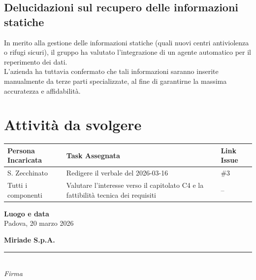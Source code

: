 \documentclass[a4paper, 10pt, colorlinks=true, linkcolor=black, urlcolor=blue, citecolor=blue, hidelinks]{article}
\begin{document}
\subsection{Delucidazioni sul recupero delle informazioni statiche}
In merito alla gestione delle informazioni statiche (quali nuovi centri antiviolenza o rifugi sicuri), il gruppo ha valutato l’integrazione di un agente automatico per il reperimento dei dati. \\ L’azienda ha tuttavia confermato che tali informazioni saranno inserite manualmente da terze parti
specializzate, al fine di garantirne la massima accuratezza e affidabilità.

\section{Attività da svolgere}
\begin{center}
\renewcommand{\arraystretch}{1.4}
\begin{tabular}{|p{4.2cm}|p{6.2cm}|p{2.2cm}|}
\hline
\textbf{Persona Incaricata} & \textbf{Task Assegnata} & \centering\textbf{Link Issue} \tabularnewline
\hline
S. Zecchinato & Redigere il verbale del 2026-03-16 & \centering \#3 \tabularnewline
\hline
Tutti i componenti & Valutare l'interesse verso il capitolato C4 e la fattibilità tecnica dei requisiti & \centering -- \tabularnewline
\hline
\end{tabular}
\end{center}

\vfill

\noindent
\begin{minipage}[t]{0.45\textwidth}
  \textbf{Luogo e data} \\
  \vspace{0.5cm}
  Padova, 20 marzo 2026
\end{minipage}
\hfill
\begin{minipage}[t]{0.45\textwidth}
  \raggedleft
  \textbf{Miriade S.p.A.} \\
  \vspace{1.2cm}
  \rule{6cm}{0.4pt} \\
  \textit{Firma}
\end{minipage}
\end{document}
